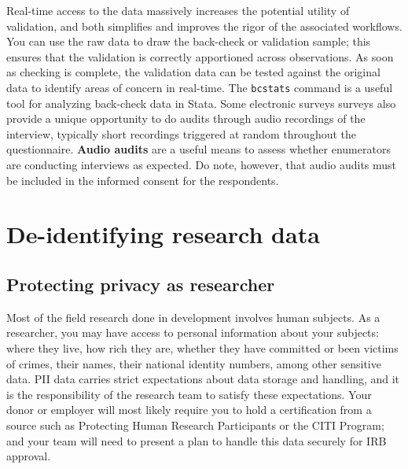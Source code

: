 \begin{fullwidth}
Real-time access to the data massively increases the potential utility of validation,
and both simplifies and improves the rigor of the associated workflows.
You can use the raw data to draw the back-check or validation sample;
this ensures that the validation is correctly apportioned across observations.
As soon as checking is complete, the validation data can be tested against
the original data to identify areas of concern in real-time.
The \texttt{bcstats} command is a useful tool for analyzing back-check data in Stata.
Some electronic surveys surveys also provide a unique opportunity
to do audits through audio recordings of the interview,
typically short recordings triggered at random throughout the questionnaire.
\textbf{Audio audits} are a useful means to assess whether enumerators are conducting interviews as expected.
Do note, however, that audio audits must be included in the informed consent for the respondents.

\section{De-identifying research data}
\subsection{Protecting privacy as researcher}

Most of the field research done in development involves human subjects.
As a researcher, you may have access to personal information about your subjects:
where they live, how rich they are, whether they have committed or been victims of crimes,
their names, their national identity numbers, among other sensitive data.
PII data carries strict expectations about data storage and handling,
and it is the responsibility of the research team to satisfy these expectations.
Your donor or employer will most likely require you to hold a certification from a source
such as Protecting Human Research Participants
or the CITI Program;
and your team will need to present a plan to handle this data securely for IRB approval.


\end{fullwidth}
